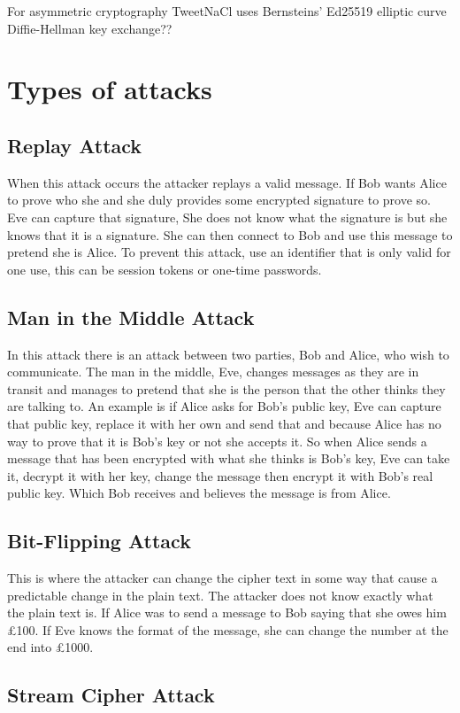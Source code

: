 For asymmetric cryptography TweetNaCl uses Bernsteins' Ed25519 elliptic curve Diffie-Hellman key exchange?? 


\section{Types of attacks}

\subsection{Replay Attack}
When this attack occurs the attacker replays a valid message. If Bob wants Alice to prove who she and she duly provides some encrypted signature to prove so. Eve can capture that signature, She does not know what the signature is but she knows that it is a signature. She can then connect to Bob and use this message to pretend she is Alice. To prevent this attack, use an identifier that is only valid for one use, this can be session tokens or one-time passwords. 

\subsection{Man in the Middle Attack}
In this attack there is an attack between two parties, Bob and Alice, who wish to communicate. The man in the middle, Eve, changes messages as they are in transit and manages to pretend that she is the person that the other thinks they are talking to. An example is if Alice asks for Bob's public key, Eve can capture that public key, replace it with her own and send that and because Alice has no way to prove that it is Bob's key or not she accepts it. So when Alice sends a message that has been encrypted with what she thinks is Bob's key, Eve can take it, decrypt it with her key, change the message then encrypt it with Bob's real public key. Which Bob receives and believes the message is from Alice.

\subsection{Bit-Flipping Attack}
This is where the attacker can change the cipher text in some way that cause a predictable change in the plain text. The attacker does not know exactly what the plain text is. If Alice was to send a message to Bob saying that she owes him £100. If Eve knows the format of the message, she can change the number at the end into £1000. 

\subsection{Stream Cipher Attack}

